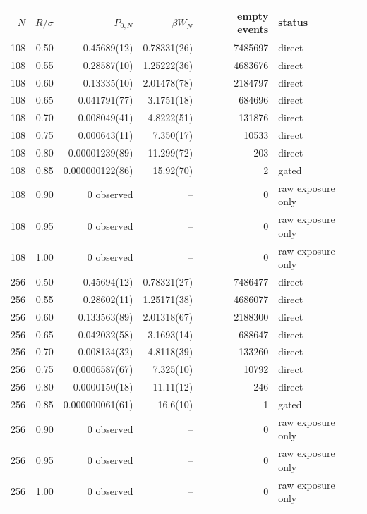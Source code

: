 \begin{tabular}{rrrrrl}
\hline
$N$ & $R/\sigma$ & $P_{0,N}$ & $\beta W_N$ & empty events & status \\
\hline
108 & 0.50 & 0.45689(12) & 0.78331(26) & 7485697 & direct \\
108 & 0.55 & 0.28587(10) & 1.25222(36) & 4683676 & direct \\
108 & 0.60 & 0.13335(10) & 2.01478(78) & 2184797 & direct \\
108 & 0.65 & 0.041791(77) & 3.1751(18) & 684696 & direct \\
108 & 0.70 & 0.008049(41) & 4.8222(51) & 131876 & direct \\
108 & 0.75 & 0.000643(11) & 7.350(17) & 10533 & direct \\
108 & 0.80 & 0.00001239(89) & 11.299(72) & 203 & direct \\
108 & 0.85 & 0.000000122(86) & 15.92(70) & 2 & gated \\
108 & 0.90 & 0 observed & -- & 0 & raw exposure only \\
108 & 0.95 & 0 observed & -- & 0 & raw exposure only \\
108 & 1.00 & 0 observed & -- & 0 & raw exposure only \\
256 & 0.50 & 0.45694(12) & 0.78321(27) & 7486477 & direct \\
256 & 0.55 & 0.28602(11) & 1.25171(38) & 4686077 & direct \\
256 & 0.60 & 0.133563(89) & 2.01318(67) & 2188300 & direct \\
256 & 0.65 & 0.042032(58) & 3.1693(14) & 688647 & direct \\
256 & 0.70 & 0.008134(32) & 4.8118(39) & 133260 & direct \\
256 & 0.75 & 0.0006587(67) & 7.325(10) & 10792 & direct \\
256 & 0.80 & 0.0000150(18) & 11.11(12) & 246 & direct \\
256 & 0.85 & 0.000000061(61) & 16.6(10) & 1 & gated \\
256 & 0.90 & 0 observed & -- & 0 & raw exposure only \\
256 & 0.95 & 0 observed & -- & 0 & raw exposure only \\
256 & 1.00 & 0 observed & -- & 0 & raw exposure only \\
\hline
\end{tabular}

